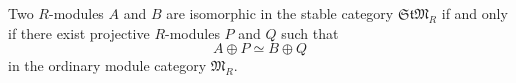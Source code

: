 Two $R$-modules $A$ and $B$ are isomorphic in the stable category $\mathfrak{StM}_R$ if and only if there exist projective $R$-modules $P$ and $Q$ such that
$$
A \oplus P \simeq B \oplus Q
$$
in the ordinary module category $\mathfrak{M}_R$.
